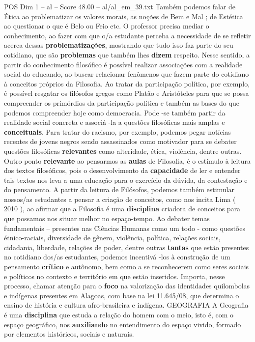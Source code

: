 \begin{textsample}{POS Dim 1 – al – Score 48.00 – al/al\_em\_39.txt}
Também podemos falar de Ética ao problematizar os valores morais, as noções de Bem e Mal ; de Estética ao questionar o que é Belo ou Feio etc.
O professor precisa mediar o conhecimento, ao fazer com que o/a estudante perceba a necessidade de se refletir acerca dessas \textbf{problematizações}, mostrando que tudo isso faz parte do seu cotidiano, que são \textbf{problemas} que também lhes \textbf{dizem} respeito.
Nesse sentido, a partir do conhecimento filosófico é possível realizar associações com a realidade social do educando, ao buscar relacionar fenômenos que fazem parte do cotidiano à conceitos próprios da Filosofia.
Ao tratar da participação política, por exemplo, é possível resgatar os filósofos gregos como Platão e Aristóteles para que se possa compreender os primórdios da participação política e também as bases do que podemos compreender hoje como democracia.
Pode -se também partir da realidade social concreta e associá -la a questões filosóficas mais amplas e \textbf{conceituais}.
Para tratar do racismo, por exemplo, podemos pegar notícias recentes de jovens negros sendo assassinados como motivador para se debater questões filosóficas \textbf{relevantes} como alteridade, ética, violência, dentre outras.
Outro ponto \textbf{relevante} ao pensarmos as \textbf{aulas} de Filosofia, é o estímulo à leitura dos textos filosóficos, pois o desenvolvimento da \textbf{capacidade} de ler e entender tais textos nos leva a uma educação para o exercício da dúvida, da contestação e do pensamento.
A partir da leitura de Filósofos, podemos também estimular nossos/as estudantes a pensar a criação de conceitos, como nos incita Lima ( 2010 ), ao afirmar que a Filosofia é uma \textbf{disciplina} criadora de conceitos para que possamos nos situar melhor no espaço-tempo.
Ao debater temas fundamentais – presentes nas Ciências Humanas como um todo - como questões étnico-raciais, diversidade de gênero, violência, política, relações sociais, cidadania, liberdade, relações de poder, dentre outras \textbf{tantas} que estão presentes no cotidiano dos/as estudantes, podemos incentivá -los à construção de um pensamento \textbf{crítico} e autônomo, bem como a se reconhecerem como seres sociais e políticos no contexto e território em que estão inseridos.
Importa, nesse processo, chamar atenção para o \textbf{foco} na valorização das identidades quilombolas e indígenas presentes em Alagoas, com base na lei 11.645/08, que determina o ensino de história e cultura afro-brasileira e indígena.
GEOGRAFIA A Geografia é uma \textbf{disciplina} que estuda a relação do homem com o meio, isto é, com o espaço geográfico, nos \textbf{auxiliando} no entendimento do espaço vivido, formado por elementos históricos, sociais e naturais.

\end{textsample}
